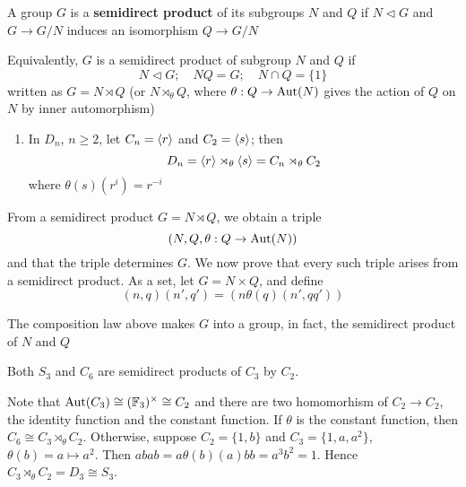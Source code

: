 \documentclass[11pt]{article}
\begin{document}
\begin{definition}[]
A group \(G\) is a \textbf{semidirect product} of its subgroups \(N\) and \(Q\) if \(N\lhd G\)
and \(G\to G/N\) induces an isomorphism \(Q\to G/N\)
\end{definition}

Equivalently, \(G\) is a semidirect product of subgroup \(N\) and \(Q\) if
\begin{equation*}
N\lhd G;\quad NQ=G;\quad N\cap Q=\{1\}
\end{equation*}
written as \(G=N\rtimes Q\) (or \(N\rtimes_\theta Q\), where \(\theta:Q\to\operatorname{\text{Aut}}(N)\) gives the action
of \(Q\) on \(N\) by inner automorphism)

\begin{examplle}[]
\begin{enumerate}
\item In \(D_n\), \(n\ge 2\), let \(C_n=\langle r\rangle\) and \(C_2=\langle s\rangle\); then
\begin{equation*}
D_n=\langle r\rangle\rtimes_\theta\langle s\rangle=C_n\rtimes_\theta C_2
\end{equation*}
where \(\theta(s)(r^i)=r^{-i}\)
\end{enumerate}
\end{examplle}

From a semidirect product \(G=N\rtimes Q\), we obtain a triple
\begin{equation*}
(N,Q,\theta:Q\to\operatorname{\text{Aut}}(N))
\end{equation*}
and that the triple determines \(G\). We now prove that every such triple arises from a
semidirect product. As a set, let \(G=N\times Q\), and define
\begin{equation*}
(n,q)(n',q')=(n\theta(q)(n',qq'))
\end{equation*}
\begin{proposition}[]
The composition law above makes \(G\) into a group, in fact, the semidirect product of \(N\) and \(Q\)
\end{proposition}

\begin{examplle}
Both \(S_3\) and \(C_6\) are semidirect products of \(C_3\) by \(C_2\).

Note that \(\operatorname{\text{Aut}}(C_3)\cong(\mathbb{F}_3)^\times\cong C_2\) and there are two homomorhism of \(C_2\to C_2\), the identity
function and the constant function. If \(\theta\) is the constant function, then \(C_6\cong C_3\rtimes_\theta C_2\).
Otherwise, suppose \(C_2=\{1,b\}\) and \(C_3=\{1,a,a^2\}\), \(\theta(b)=a\mapsto a^2\). Then
\(abab=a\theta(b)(a)bb=a^3b^2=1\). Hence \(C_3\rtimes_\theta C_2=D_3\cong S_3\).
\end{examplle}
\end{document}

